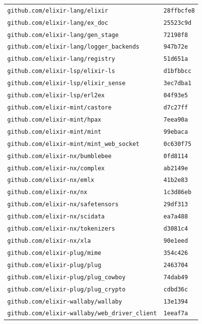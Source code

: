 \begin{longtable}{@{}p{} l@{}}
\texttt{github.com/elixir-lang/elixir} & \texttt{28ffbcfe8} \\
\texttt{github.com/elixir-lang/ex\_doc} & \texttt{25523c9d} \\
\texttt{github.com/elixir-lang/gen\_stage} & \texttt{72198f8} \\
\texttt{github.com/elixir-lang/logger\_backends} & \texttt{947b72e} \\
\texttt{github.com/elixir-lang/registry} & \texttt{51d651a} \\
\texttt{github.com/elixir-lsp/elixir-ls} & \texttt{d1bfbbcc} \\
\texttt{github.com/elixir-lsp/elixir\_sense} & \texttt{3ec7dba1} \\
\texttt{github.com/elixir-lsp/erl2ex} & \texttt{04f93e5} \\
\texttt{github.com/elixir-mint/castore} & \texttt{d7c27ff} \\
\texttt{github.com/elixir-mint/hpax} & \texttt{7eea90a} \\
\texttt{github.com/elixir-mint/mint} & \texttt{99ebaca} \\
\texttt{github.com/elixir-mint/mint\_web\_socket} & \texttt{0c630f75} \\
\texttt{github.com/elixir-nx/bumblebee} & \texttt{0fd8114} \\
\texttt{github.com/elixir-nx/complex} & \texttt{ab2149e} \\
\texttt{github.com/elixir-nx/emlx} & \texttt{41b2e83} \\
\texttt{github.com/elixir-nx/nx} & \texttt{1c3d86eb} \\
\texttt{github.com/elixir-nx/safetensors} & \texttt{29df313} \\
\texttt{github.com/elixir-nx/scidata} & \texttt{ea7a488} \\
\texttt{github.com/elixir-nx/tokenizers} & \texttt{d3081c4} \\
\texttt{github.com/elixir-nx/xla} & \texttt{90e1eed} \\
\texttt{github.com/elixir-plug/mime} & \texttt{354c426} \\
\texttt{github.com/elixir-plug/plug} & \texttt{2463704} \\
\texttt{github.com/elixir-plug/plug\_cowboy} & \texttt{74dab49} \\
\texttt{github.com/elixir-plug/plug\_crypto} & \texttt{cdbd36c} \\
\texttt{github.com/elixir-wallaby/wallaby} & \texttt{13e1394} \\
\texttt{github.com/elixir-wallaby/web\_driver\_client} & \texttt{1eeaf7a} \\

\end{longtable}
